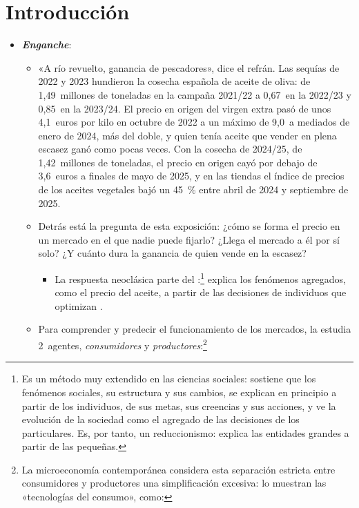 \documentclass[11pt]{article}
\begin{document}
\tceetitulo

\section*{Introducción}

\begin{itemize}
\item \textbf{\emph{Enganche}}:
  \begin{itemize}
  \item «A río revuelto, ganancia de pescadores», dice el refrán. Las sequías de 2022 y 2023 hundieron la cosecha española de aceite de oliva: de 1,49~millones de toneladas en la campaña 2021/22 a 0,67~en la 2022/23 y 0,85~en la 2023/24\nocite{CE2026AceiteProduccion}. El precio en origen del virgen extra pasó de unos 4,1~euros por kilo en octubre de 2022 a un máximo de 9,0~a mediados de enero de 2024, más del doble, y quien tenía aceite que vender en plena escasez ganó como pocas veces. Con la cosecha de 2024/25, de 1,42~millones de toneladas, el precio en origen cayó por debajo de 3,6~euros a finales de mayo de 2025\nocite{CE2026AceitePrecios}, y en las tiendas el índice de precios de los aceites vegetales bajó un 45~\% entre abril de 2024 y septiembre de 2025\nocite{INE2026IPCAceites}.
  \item Detrás está la pregunta de esta exposición: ¿cómo se forma el precio en un mercado en el que nadie puede fijarlo? ¿Llega el mercado a él por sí solo? ¿Y cuánto dura la ganancia de quien vende en la escasez?
    \begin{itemize}
    \item La respuesta neoclásica parte del :\footnote{Es un método muy extendido en las ciencias sociales: sostiene que los fenómenos sociales, su estructura y sus cambios, se explican en principio a partir de los individuos, de sus metas, sus creencias y sus acciones, y ve la evolución de la sociedad como el agregado de las decisiones de los particulares. Es, por tanto, un reduccionismo: explica las entidades grandes a partir de las pequeñas.} explica los fenómenos agregados, como el precio del aceite, a partir de las decisiones de individuos que optimizan .
    \end{itemize}
  \item Para comprender y predecir el funcionamiento de los mercados, la  estudia 2~agentes, \emph{consumidores} y \emph{productores}:\footnote{La microeconomía contemporánea considera esta separación estricta entre consumidores y productores una simplificación excesiva\nocite{EkelundHebert2013History}: lo muestran las «tecnologías del consumo», como:
}
\end{itemize}
\end{itemize}
\end{document}
